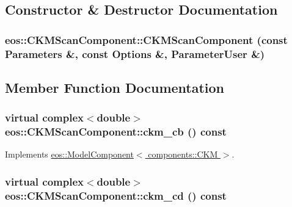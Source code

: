 \subsection{Constructor \& Destructor Documentation}
\hypertarget{classeos_1_1CKMScanComponent_a32c081a531442445b5f5e472763c6326}{
\subsubsection[{CKMScanComponent}]{\setlength{\rightskip}{0pt plus 5cm}eos::CKMScanComponent::CKMScanComponent (const {\bf Parameters} \&, \/  const {\bf Options} \&, \/  {\bf ParameterUser} \&)}}
\label{classeos_1_1CKMScanComponent_a32c081a531442445b5f5e472763c6326}


\subsection{Member Function Documentation}
\hypertarget{classeos_1_1CKMScanComponent_a420671fc6106cda58d97d82af85dddf3}{
\subsubsection[{ckm\_\-cb}]{\setlength{\rightskip}{0pt plus 5cm}virtual complex$<$double$>$ eos::CKMScanComponent::ckm\_\-cb () const}}
\label{classeos_1_1CKMScanComponent_a420671fc6106cda58d97d82af85dddf3}


Implements \hyperlink{classeos_1_1ModelComponent_3_01components_1_1CKM_01_4_aacb78ba3cf4df16bff0c6b6289b1a955}{eos::ModelComponent$<$ components::CKM $>$}.\hypertarget{classeos_1_1CKMScanComponent_afcdd4f857807dcb95aa252f45cbc9e41}{
\subsubsection[{ckm\_\-cd}]{\setlength{\rightskip}{0pt plus 5cm}virtual complex$<$double$>$ eos::CKMScanComponent::ckm\_\-cd () const}}
\label{classeos_1_1CKMScanComponent_afcdd4f857807dcb95aa252f45cbc9e41}



